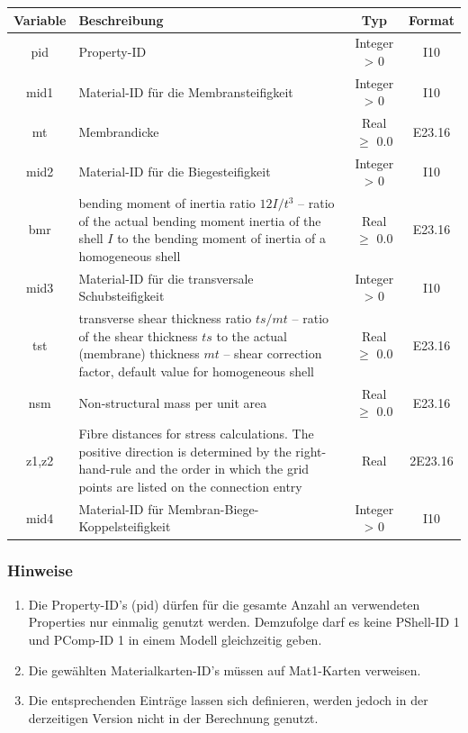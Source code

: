 \documentclass[11pt,titlepage,listof=totoc,bibliography=totoc,twoside]{scrreprt}
\begin{document}
{{\begin{tabularx}{\textwidth}{cXcc}
\toprule
Variable& Beschreibung												& Typ			& Format	\\
\midrule
pid	& Property-ID												& Integer > 0		& I10		\\
mid1	& Material-ID für die Membransteifigkeit								& Integer > 0		& I10		\\
mt	& Membrandicke												& Real $\ge$ 0.0	& E23.16	\\
mid2	& Material-ID für die Biegesteifigkeit									& Integer > 0		& I10		\\
bmr	& bending moment of inertia ratio $12I/t^3$ -- ratio of the actual bending moment inertia of the shell $I$ to the bending moment of inertia of a homogeneous shell																		& Real $\ge$ 0.0	& E23.16	\\
mid3	& Material-ID für die transversale Schubsteifigkeit							& Integer > 0		& I10		\\
tst	& transverse shear thickness ratio $ts/mt$ -- ratio of the shear thickness $ts$ to the actual (membrane) thickness $mt$ -- shear correction factor, default value for homogeneous shell																& Real $\ge$ 0.0	& E23.16	\\
nsm	& Non-structural mass per unit area									& Real $\ge$ 0.0	& E23.16	\\
z1,z2	& Fibre distances for stress calculations. The positive direction is determined by the right-hand-rule and the order in which the grid points are listed on the connection entry																& Real			& 2E23.16	\\
mid4	& Material-ID für Membran-Biege-Koppelsteifigkeit							& Integer > 0		& I10		\\
\bottomrule
\end{tabularx}

\subsubsection{Hinweise}

\begin{enumerate}
\item Die Property-ID's (pid) dürfen für die gesamte Anzahl an verwendeten Properties nur einmalig genutzt werden. Demzufolge darf es keine PShell-ID 1 und PComp-ID 1 in einem Modell gleichzeitig geben.
\item Die gewählten Materialkarten-ID's müssen auf Mat1-Karten verweisen.
\item Die entsprechenden Einträge lassen sich definieren, werden jedoch in der derzeitigen Version nicht in der Berechnung genutzt.
\end{enumerate}

}}
\end{document}
